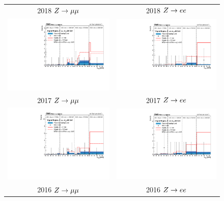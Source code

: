 \begin{figure}[htb!]
	\centering
	\begin{tabular}{c c}
		2018 $Z\to\mu\mu$ & 2018 $Z\to ee$\\
		\includegraphics[width=0.45\linewidth]{figs/05_analysis/closure_ZH_MU_m30_data_2018.pdf} &
		\includegraphics[width=0.45\linewidth]{figs/05_analysis/closure_ZH_ELE_m30_data_2018.pdf} \\
		2017 $Z\to\mu\mu$ & 2017 $Z\to ee$\\
		\includegraphics[width=0.45\linewidth]{figs/05_analysis/closure_ZH_MU_m30_data_2017.pdf} &
		\includegraphics[width=0.45\linewidth]{figs/05_analysis/closure_ZH_ELE_m30_data_2017.pdf} \\
		2016 $Z\to\mu\mu$ & 2016 $Z\to ee$\\

\end{tabular}
\end{figure}

